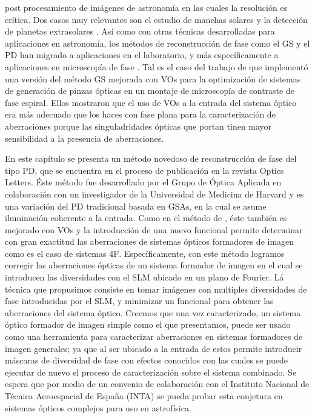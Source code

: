 post procesamiento de imágenes de astronomía en las cuales la
resolución es crítica. Dos casos muy relevantes son el estudio de
manchas solares y la detección de planetas extrasolares . 
Así como con otras técnicas desarrolladas para aplicaciones en
astronomía, los métodos de reconstrucción de fase como el
GS y el PD han migrado a aplicaciones en el
laboratorio, y más específicamente a aplicaciones en microscopía de
fase . Tal es el caso
del trabajo de  que implementó una versión del
método GS mejorada con VOs para la optimización de sistemas de
generación de pinzas ópticas en un montaje de microscopía de
contraste de fase espiral.  Ellos mostraron que el uso de VOs a la
entrada del sistema óptico era más adecuado que los haces con fase
plana para la caracterización de aberraciones porque las
singuladridades ópticas que portan tinen mayor sensibilidad a la 
presencia de aberraciones. 

En este capítulo se presenta un método novedoso de reconstrucción de
fase del tipo PD, que se encuentra en el proceso de publicación en la
revista Optics Letters. Éste método fue desarrollado por el Grupo de Óptica Aplicada en
colaboración con un investigador de la Universidad de Medicina de
Harvard y es una variación del PD tradicional basada en GSAs, en la
cual se asume iluminación coherente a la entrada. Como en el método de
, éste también es mejorado con VOs y la
introducción de una nuevo funcional permite determinar con gran exactitud las
aberraciones de sistemas ópticos formadores de imagen como es el caso
de sistemas 4F.  Específicamente, con este método logramos corregir las aberraciones ópticas
de un sistema formador de imagen en el cual se introducen las
diversidades con el SLM ubicado en un plano de Fourier.
Lá técnica que propusimos consiste en tomar imágenes con multiples
diversidades de fase introducidas por el SLM, y minimizar un funcional 
para obtener las aberraciones del sistema óptico. 
Creemos que una vez caracterizado, un sistema óptico formador de
imagen simple como el que presentamos, puede ser usado como una herramienta para
caracterizar aberraciones en sistemas formadores de imagen generales;
ya que al ser ubicado a la entrada de estos permite introducir
máscaras de diversidad de fase con efectos conocidos con las cuales se
puede ejecutar de nuevo el proceso de caracterización sobre el sistema
combinado. Se espera que por medio de un convenio de colaboración con
el Instituto Nacional de Técnica Aeroespacial de España  (INTA) se
pueda probar esta conjetura en sistemas ópticos
complejos para uso en astrofísica. 

